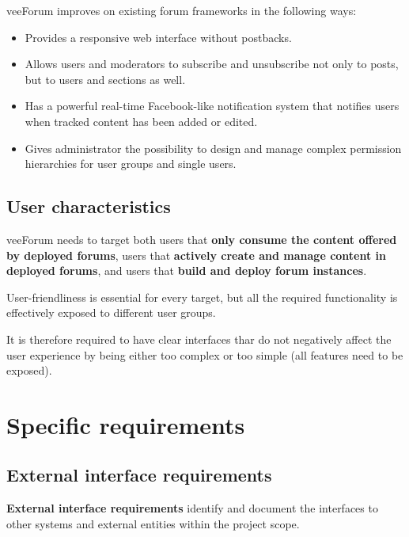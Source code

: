 \documentclass[12pt]{report}
\renewcommand\emph{\textbf}
\begin{document}
                    veeForum improves on existing forum frameworks in the following ways:

                    \begin{itemize}
                        \item Provides a responsive web interface without postbacks.
                        \item Allows users and moderators to subscribe and unsubscribe not only to posts, but to users and sections as well.
                        \item Has a powerful real-time Facebook-like notification system that notifies users when tracked content has been added or edited.
                        \item Gives administrator the possibility to design and manage complex permission hierarchies for user groups and single users.
                    \end{itemize}

                \subsection{User characteristics}
                    veeForum needs to target both users that \emph{only consume the content offered by deployed forums}, users that \emph{actively create and manage content in deployed forums}, and users that \emph{build and deploy forum instances}.

                    User-friendliness is essential for every target, but all the required functionality is effectively exposed to different user groups.

                    It is therefore required to have clear interfaces thar do not negatively affect the user experience by being either too complex or too simple (all features need to be exposed).

            \section{Specific requirements}

                \subsection{External interface requirements}

                    \emph{External interface requirements} identify and document the interfaces to other systems and external entities within the project scope. 
\end{document}
